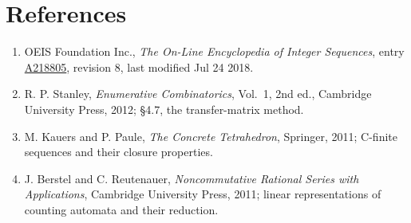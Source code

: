 \documentclass[11pt]{article}
\theoremstyle{definition}
\begin{document}
\section{References}

\begin{enumerate}

\item OEIS Foundation Inc., \emph{The On-Line Encyclopedia of Integer Sequences}, entry \href{https://oeis.org/A218805}{A218805}, revision 8, last modified Jul 24 2018.

\item R. P. Stanley, \emph{Enumerative Combinatorics}, Vol.~1, 2nd ed., Cambridge University Press, 2012; \S4.7, the transfer-matrix method.

\item M. Kauers and P. Paule, \emph{The Concrete Tetrahedron}, Springer, 2011; C-finite sequences and their closure properties.

\item J. Berstel and C. Reutenauer, \emph{Noncommutative Rational Series with Applications}, Cambridge University Press, 2011; linear representations of counting automata and their reduction.

\end{enumerate}
\end{document}
